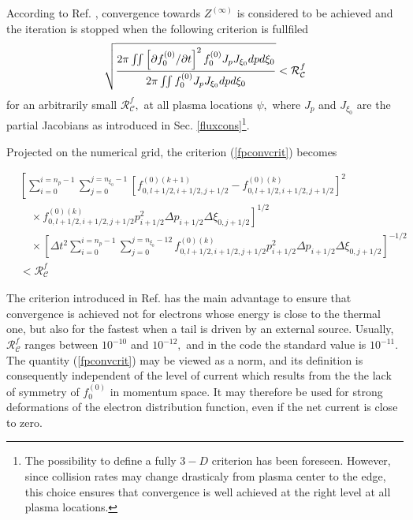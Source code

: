 According to Ref. \cite{biz97}, convergence towards $Z^{(\infty )}$ is
considered to be achieved and the iteration is stopped when the following
criterion is fullfiled
\begin{equation}
\sqrt{\frac{2\pi \iint \left[ \partial f_{0}^{\left( 0\right) }/\partial
t\right] ^{2}f_{0}^{\left( 0\right) }J_{p}J_{\xi _{0}}dpd\xi _{0}}{2\pi
\iint f_{0}^{\left( 0\right) }J_{p}J_{\xi _{0}}dpd\xi _{0}}}<\mathcal{R}_{%
\mathcal{C}}^{f}  \label{fpconvcrit}
\end{equation}
for an arbitrarily small $\mathcal{R}_{\mathcal{C}}^{f},$ at all plasma
locations $\psi ,$ where $J_{p}$ and $J_{\xi _{0}}$ are the partial
Jacobians as introduced in Sec. \ref{fluxcons}\footnote{%
The possibility to define a fully $3-D$ criterion has been foreseen.
However, since collision rates may change drasticaly from plasma center to
the edge, this choice ensures that convergence is well achieved at the right
level at all plasma locations.}.

Projected on the numerical grid, the criterion (\ref{fpconvcrit}) becomes

\begin{align}
&\left[\sum_{i=0}^{i=n_{p}-1}\sum_{j=0}^{j=n_{\xi _{0}}-1}\left[
f_{0,l+1/2,i+1/2,j+1/2}^{\left( 0\right) \left( k+1\right)
}-f_{0,l+1/2,i+1/2,j+1/2}^{\left( 0\right) \left( k\right)
}\right] ^{2}\right.\nonumber\\&\left.\quad\times
f_{0,l+1/2,i+1/2,j+1/2}^{\left( 0\right) \left( k\right)
}p_{i+1/2}^{2}\Delta p_{i+1/2}\Delta \xi _{0,j+1/2}\right]^{1/2}
\nonumber\\&\quad\times \left[\Delta
t^{2}\sum_{i=0}^{i=n_{p}-1}\sum_{j=0}^{j=n_{\xi
_{0}}-12}f_{0,l+1/2,i+1/2,j+1/2}^{\left( 0\right) \left( k\right)
}p_{i+1/2}^{2}\Delta p_{i+1/2}\Delta \xi
_{0,j+1/2}\right]^{-1/2}\nonumber\\&
<\mathcal{R}_{\mathcal{C%
}}^{f}
\end{align}

The criterion introduced in Ref. \cite{kar86} has the main advantage to
ensure that convergence is achieved not for electrons whose energy is close
to the thermal one, but also for the fastest when a tail is driven by an
external source. Usually, $\mathcal{R}_{\mathcal{C}}^{f}$ ranges between $%
10^{-10}$ and $10^{-12},$ and in the code the standard value is $10^{-11}.$
The quantity (\ref{fpconvcrit}) may be viewed as a norm, and its definition
is consequently independent of the level of current which results from the
the lack of symmetry of $f_{0}^{\left( 0\right) }$ in momentum space. It may
therefore be used for strong deformations of the electron distribution
function, even if the net current is close to zero.

